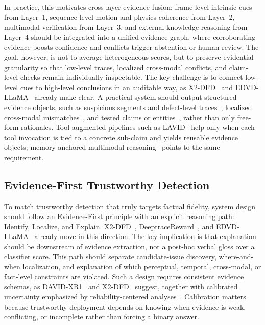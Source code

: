 In practice, this motivates cross-layer evidence fusion: frame-level intrinsic cues from Layer~1, sequence-level motion and physics coherence from Layer~2, multimodal verification from Layer~3, and external-knowledge reasoning from Layer~4 should be integrated into a unified evidence graph, where corroborating evidence boosts confidence and conflicts trigger abstention or human review. The goal, however, is not to average heterogeneous scores, but to preserve evidential granularity so that low-level traces, localized cross-modal conflicts, and claim-level checks remain individually inspectable. The key challenge is to connect low-level cues to high-level conclusions in an auditable way, as X2-DFD~\citep{chen2024x2dfd} and EDVD-LLaMA~\citep{sun2025edvd} already make clear. A practical system should output structured evidence objects, such as suspicious segments and defect-level traces~\citep{gao2025david,anshul2025next}, localized cross-modal mismatches~\citep{katamneni2024contextualcrossmodalattentionaudiovisual,chen2024x2dfd}, and tested claims or entities~\citep{zhang2024common}, rather than only free-form rationales. Tool-augmented pipelines such as LAVID~\citep{Liu2025LAVID} help only when each tool invocation is tied to a concrete sub-claim and yields reusable evidence objects; memory-anchored multimodal reasoning~\citep{chen2025memory} points to the same requirement.

\subsection{Evidence-First Trustworthy Detection}
\label{sec:evidence-first}
To match trustworthy detection that truly targets factual fidelity, system design should follow an Evidence-First principle with an explicit reasoning path: Identify, Localize, and Explain. X2-DFD~\citep{chen2024x2dfd}, DeeptraceReward~\citep{Fu2025DeeptraceReward}, and EDVD-LLaMA~\citep{sun2025edvd} already move in this direction. The key implication is that explanation should be downstream of evidence extraction, not a post-hoc verbal gloss over a classifier score. This path should separate candidate-issue discovery, where-and-when localization, and explanation of which perceptual, temporal, cross-modal, or fact-level constraints are violated. Such a design requires consistent evidence schemas, as DAVID-XR1~\citep{gao2025david} and X2-DFD~\citep{chen2024x2dfd} suggest, together with calibrated uncertainty emphasized by reliability-centered analyses~\citep{Wang2024DeepfakeReliability}. Calibration matters because trustworthy deployment depends on knowing when evidence is weak, conflicting, or incomplete rather than forcing a binary answer.

